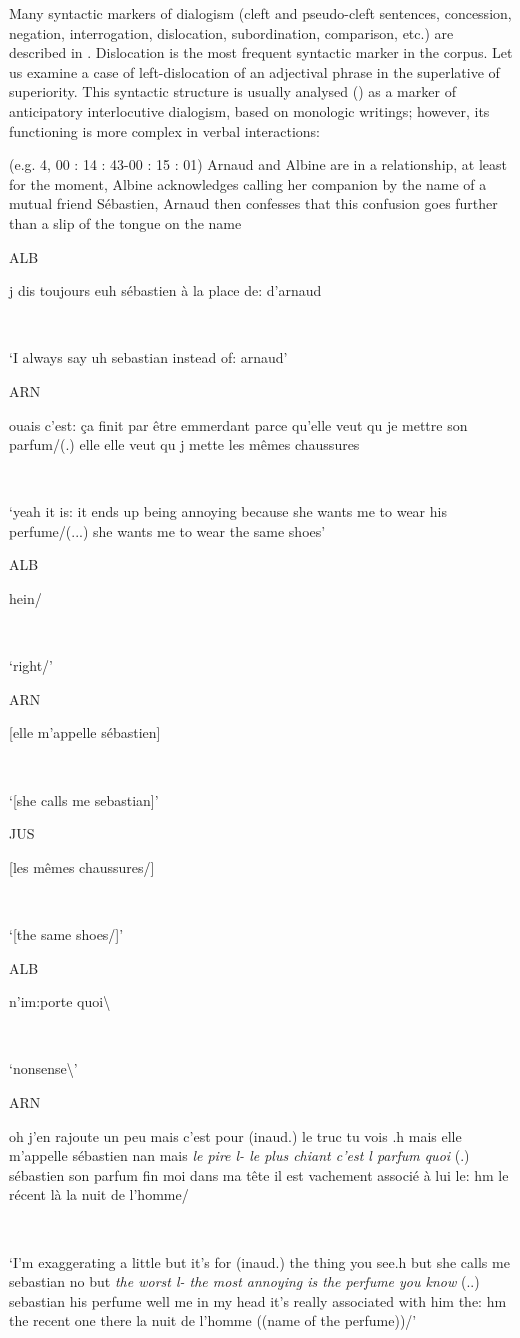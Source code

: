\documentclass[output=paper]{langscibook}
\begin{document}
Many syntactic markers of dialogism (cleft and pseudo-cleft sentences, concession, negation, interrogation, dislocation, subordination, comparison, etc.) are described in \citet{BresEtAl2019}. Dislocation is the most frequent syntactic marker in the corpus. Let us examine a case of left-dislocation of an adjectival phrase in the superlative of superiority. This syntactic structure is usually analysed (\citealt{Nowakowska2009,BresEtAl2019}) as a marker of anticipatory interlocutive dialogism, based on monologic writings; however, its functioning is more complex in verbal interactions:

\ea 

\label{ex:8:5}

{(e.g. 4, 00 : 14 : 43-00 : 15 : 01) Arnaud and Albine are in a relationship, at least for the moment, Albine acknowledges calling her companion by the name of a mutual friend Sébastien, Arnaud then confesses that this confusion goes further than a slip of the tongue on the name} 

\upshape\ttfamily
\parbox{8mm}{ALB}{  j{\textasciigrave} dis toujours euh sébastien à la place de: d'arnaud}\\
\parbox{8mm}{~}{  ‘I always say uh sebastian instead of: arnaud’}\medskip

\parbox{8mm}{ARN}{  ouais c'est: ça finit par être emmerdant parce qu'elle veut qu{\textasciigrave} je mettre son parfum/(.) elle elle veut qu{\textasciigrave} j{\textasciigrave} mette les mêmes chaussures}\\ 
\parbox{8mm}{~}{  ‘yeah it is: it ends up being annoying because she wants me to wear his perfume/(...) she wants me to wear the same shoes’}\medskip

\parbox{8mm}{ALB}{hein/}\\ 
\parbox{8mm}{~}{  ‘right/’}\medskip

\parbox{8mm}{ARN}{[elle m'appelle sébastien]}\\
\parbox{8mm}{~}{  ‘[she calls me sebastian]’}\medskip

\parbox{8mm}{JUS}{[les mêmes chaussures/]}\\
\parbox{8mm}{~}{  ‘[the same shoes/]’}

\parbox{8mm}{ALB}{  n'im:porte quoi{\textbackslash}}\\
\parbox{8mm}{~}{  ‘nonsense{\textbackslash}’}

\parbox{8mm}{ARN}{oh j'en rajoute un peu mais c'est pour (inaud.) le truc tu vois .h mais elle m'appelle sébastien nan mais \textsl{le pire l- le plus chiant c'est l{\textasciigrave} parfum quoi} (.) sébastien son parfum {\textasciigrave}fin moi dans ma tête il est vachement associé à lui le: hm le récent là la nuit de l'homme/}\\
\parbox{8mm}{~}{‘I’m exaggerating a little but it's for (inaud.) the thing you see.h but she calls me sebastian no but \textsl{the worst l- the most annoying is the perfume you know} (..) sebastian his perfume {\textasciigrave}well me in my head it's really associated with him the: hm the recent one there la nuit de l'homme ((name of the perfume))/’}\medskip
\end{document}
